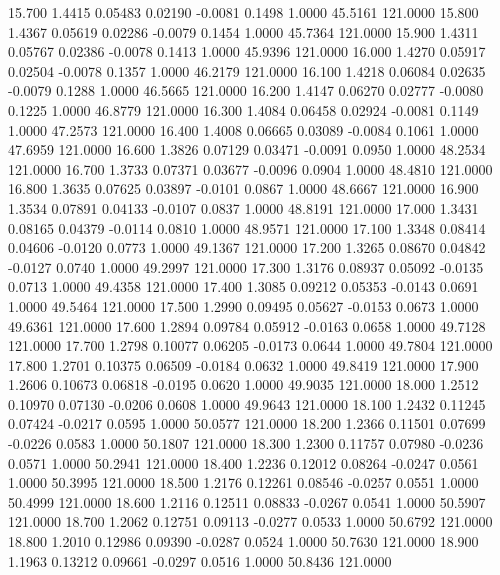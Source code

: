   15.700   1.4415   0.05483   0.02190  -0.0081   0.1498   1.0000  45.5161 121.0000
  15.800   1.4367   0.05619   0.02286  -0.0079   0.1454   1.0000  45.7364 121.0000
  15.900   1.4311   0.05767   0.02386  -0.0078   0.1413   1.0000  45.9396 121.0000
  16.000   1.4270   0.05917   0.02504  -0.0078   0.1357   1.0000  46.2179 121.0000
  16.100   1.4218   0.06084   0.02635  -0.0079   0.1288   1.0000  46.5665 121.0000
  16.200   1.4147   0.06270   0.02777  -0.0080   0.1225   1.0000  46.8779 121.0000
  16.300   1.4084   0.06458   0.02924  -0.0081   0.1149   1.0000  47.2573 121.0000
  16.400   1.4008   0.06665   0.03089  -0.0084   0.1061   1.0000  47.6959 121.0000
  16.600   1.3826   0.07129   0.03471  -0.0091   0.0950   1.0000  48.2534 121.0000
  16.700   1.3733   0.07371   0.03677  -0.0096   0.0904   1.0000  48.4810 121.0000
  16.800   1.3635   0.07625   0.03897  -0.0101   0.0867   1.0000  48.6667 121.0000
  16.900   1.3534   0.07891   0.04133  -0.0107   0.0837   1.0000  48.8191 121.0000
  17.000   1.3431   0.08165   0.04379  -0.0114   0.0810   1.0000  48.9571 121.0000
  17.100   1.3348   0.08414   0.04606  -0.0120   0.0773   1.0000  49.1367 121.0000
  17.200   1.3265   0.08670   0.04842  -0.0127   0.0740   1.0000  49.2997 121.0000
  17.300   1.3176   0.08937   0.05092  -0.0135   0.0713   1.0000  49.4358 121.0000
  17.400   1.3085   0.09212   0.05353  -0.0143   0.0691   1.0000  49.5464 121.0000
  17.500   1.2990   0.09495   0.05627  -0.0153   0.0673   1.0000  49.6361 121.0000
  17.600   1.2894   0.09784   0.05912  -0.0163   0.0658   1.0000  49.7128 121.0000
  17.700   1.2798   0.10077   0.06205  -0.0173   0.0644   1.0000  49.7804 121.0000
  17.800   1.2701   0.10375   0.06509  -0.0184   0.0632   1.0000  49.8419 121.0000
  17.900   1.2606   0.10673   0.06818  -0.0195   0.0620   1.0000  49.9035 121.0000
  18.000   1.2512   0.10970   0.07130  -0.0206   0.0608   1.0000  49.9643 121.0000
  18.100   1.2432   0.11245   0.07424  -0.0217   0.0595   1.0000  50.0577 121.0000
  18.200   1.2366   0.11501   0.07699  -0.0226   0.0583   1.0000  50.1807 121.0000
  18.300   1.2300   0.11757   0.07980  -0.0236   0.0571   1.0000  50.2941 121.0000
  18.400   1.2236   0.12012   0.08264  -0.0247   0.0561   1.0000  50.3995 121.0000
  18.500   1.2176   0.12261   0.08546  -0.0257   0.0551   1.0000  50.4999 121.0000
  18.600   1.2116   0.12511   0.08833  -0.0267   0.0541   1.0000  50.5907 121.0000
  18.700   1.2062   0.12751   0.09113  -0.0277   0.0533   1.0000  50.6792 121.0000
  18.800   1.2010   0.12986   0.09390  -0.0287   0.0524   1.0000  50.7630 121.0000
  18.900   1.1963   0.13212   0.09661  -0.0297   0.0516   1.0000  50.8436 121.0000
